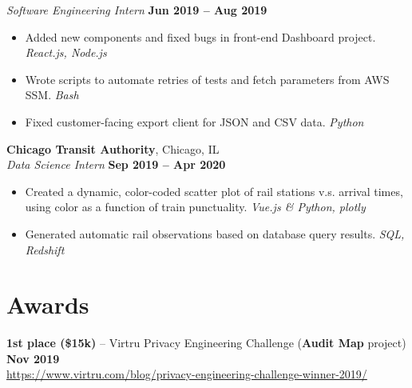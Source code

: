 \documentclass[margin]{resume}
\begin{document}
    \textsl{Software Engineering Intern} \hfill \textbf{Jun 2019 -- Aug 2019}

\begin{itemize}
\item Added new components and fixed bugs in front-end Dashboard project. \hfill \textit{React.js, Node.js}
\item Wrote scripts to automate retries of tests and fetch parameters from AWS SSM. \hfill \textit{Bash}
\item Fixed customer-facing export client for JSON and CSV data. \hfill \textit{Python}
\end{itemize}


    \textcolor{blu}{\textbf{Chicago Transit Authority}}, Chicago, IL \vspace{2mm}\\\vspace{1mm}%
    \textsl{Data Science Intern} \hfill \textbf{Sep 2019 -- Apr 2020}

    \begin{itemize}
\item Created a dynamic, color-coded scatter plot of rail stations v.s. arrival times, \\using color as a function of train punctuality. \hfill \textit{Vue.js \& Python, plotly}


\item Generated automatic rail observations based on database query results. \hfill \textit{SQL, Redshift}

    \end{itemize}



    \section{\mysidestyle Awards}
    \textcolor{blu}{\textbf{1st place (\$15k)}} -- Virtru Privacy Engineering Challenge (\textbf {Audit Map} project) \hfill \textbf{Nov 2019} \\ \url{https://www.virtru.com/blog/privacy-engineering-challenge-winner-2019/}
\end{document}
